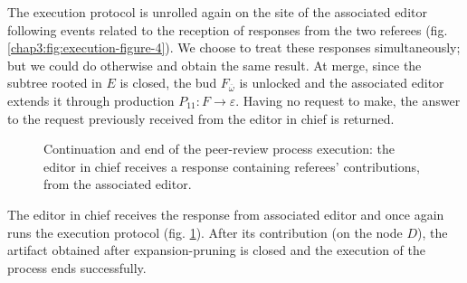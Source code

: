 The execution protocol is unrolled again on the site of the associated editor following events related to the reception of responses from the two referees (fig. \ref{chap3:fig:execution-figure-4}). We choose to treat these responses simultaneously; but we could do otherwise and obtain the same result. 
At merge, since the subtree rooted in $E$ is closed, the bud $F_{\overline{\omega}}$ is unlocked and the associated editor extends it through production $P_{11}: F \rightarrow \varepsilon$. Having no request to make, the answer to the request previously received from the editor in chief is returned.
\begin{figure}[ht!]
	\noindent
	\caption{Continuation and end of the peer-review process execution: the editor in chief receives a response containing referees' contributions, from the associated editor.}
	\label{chap3:fig:execution-figure-5}
\end{figure}

The editor in chief receives the response from associated editor and once again runs the execution protocol (fig. \ref{chap3:fig:execution-figure-5}). 
After its contribution (on the node $D$), the artifact obtained after expansion-pruning is closed and the execution of the process ends successfully.
